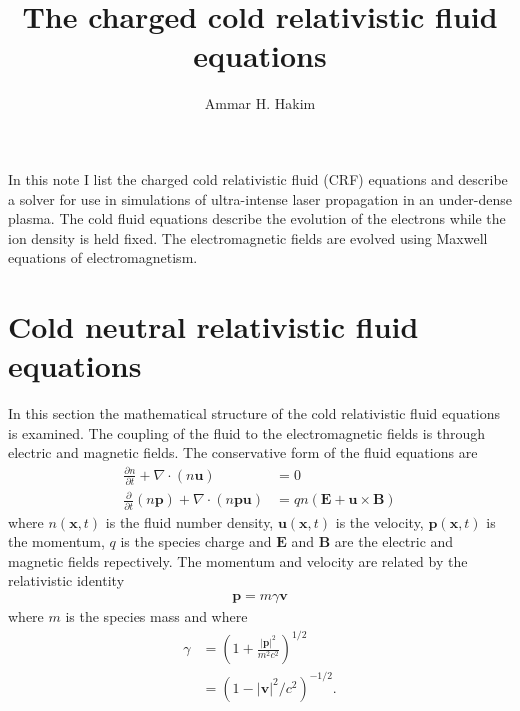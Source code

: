 \documentclass[11pt, reqno]{amsart}
\title{The charged cold relativistic fluid equations}%
\author{Ammar H. Hakim}%
\date{}
\newcommand{\pfrac}[2]{\frac{\partial #1}{\partial #2}}
\newcommand{\pfraca}[1]{\frac{\partial}{\partial #1}}
\newcommand{\mvec}[1]{\mathbf{#1}}
\theoremstyle{definition}
\begin{document}

\maketitle

In this note I list the charged cold relativistic fluid (CRF)
equations and describe a solver for use in simulations of
ultra-intense laser propagation in an under-dense plasma. The cold
fluid equations describe the evolution of the electrons while the ion
density is held fixed. The electromagnetic fields are evolved using
Maxwell equations of electromagnetism.

\section{Cold neutral relativistic fluid equations}

In this section the mathematical structure of the cold relativistic
fluid equations is examined. The coupling of the fluid to the
electromagnetic fields is through electric and magnetic fields. The
conservative form of the fluid equations are
\begin{align}
  \pfrac{n}{t} + \nabla\cdot(n\mvec{u}) &= 0 \\
  \pfraca{t}(n\mvec{p}) + \nabla\cdot (n\mvec{p}\mvec{u}) &= 
  qn\left(\mvec{E} + \mvec{u}\times\mvec{B}\right)
\end{align}
where $n(\mvec{x},t)$ is the fluid number density,
$\mvec{u}(\mvec{x},t)$ is the velocity, $\mvec{p}(\mvec{x},t)$ is the
momentum, $q$ is the species charge and $\mvec{E}$ and $\mvec{B}$ are
the electric and magnetic fields repectively. The momentum and
velocity are related by the relativistic identity
\begin{align}
  \mvec{p} = m\gamma \mvec{v}
\end{align}
where $m$ is the species mass and where
\begin{align}
  \gamma &= \left(1+\frac{|\mvec{p}|^2}{m^2c^2}\right)^{1/2} \\
  &= \left(1-|\mvec{v}|^2/c^2\right)^{-1/2}.
\end{align}
\end{document}

